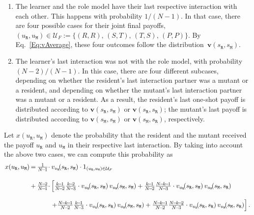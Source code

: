 \documentclass[11pt]{article}
\def\resident{\texttt{R}}
\def\mutant{\texttt{M}}
\def\strategy{s}
\theoremstyle{plainCl1}
\theoremstyle{plainCl2}
\begin{document}

\begin{enumerate}
\item The learner and the role model have their last respective interaction with each other. This happens with probability $1/(N\!-\!1)$. In that case, there are four possible cases for their joint final payoffs, $(u_\resident,u_\mutant)\in\mathcal{U}_F\!:=\!\big\{(R,R),\,(S,T),\,(T,S),\,(P,P)\big\}$. By Eq.~\eqref{Eq:vAverage}, these four outcomes follow the distribution~$\mathbf{v}(\strategy_\resident,\strategy_\mutant)$.
\item The learner's last interaction was not with the role model, with probability $(N\!-\!2)/(N\!-\!1)$. In this case, there are four different subcases, depending on whether the resident's last interaction partner was a mutant or a resident, and depending on whether the mutant's last interaction partner was a mutant or a resident. As a result, the resident's last one-shot payoff is distributed according to $\mathbf{v}(\strategy_\resident,\strategy_\mutant)$ or $\mathbf{v}(\strategy_\resident,\strategy_\resident)$; the mutant's last payoff is distributed according to $\mathbf{v}(\strategy_\mutant,\strategy_\mutant)$ or $\mathbf{v}(\strategy_\mutant,\strategy_\resident)$, respectively. 
\end{enumerate}

\noindent
Let $x(u_\resident,u_\mutant)$ denote the probability that the resident and the mutant received the payoff $u_\resident$ and $u_\mutant$ in their respective last interaction.  
By taking into account the above two cases, we can compute this probability as
\begin{equation}\label{eq:Chi} 
\setlength{\arraycolsep}{1pt} 
\begin{array}{llll}
x(u_\resident,u_\mutant)	 &=
&\frac{1}{N\!-\!1}\cdot  & v_{u_\resident}\!(\strategy_\resident,\strategy_\mutant)\cdot 1_{(u_\resident,u_\mutant)\in \mathcal{U}_F}\\[0.5cm]
&+	
&\frac{N\!-\!2}{N\!-\!1} \cdot 
&\left[ \frac{k\!-\!1}{N\!-\!2}\frac{k\!-\!2}{N\!-\!3}\cdot  v_{u_\resident}\!(\strategy_\resident,\strategy_\mutant) \, v_{u_\mutant}\!(\strategy_\mutant,\strategy_\mutant) + 
 \frac{k\!-\!1}{N\!-\!2}\frac{N\!-\!k\!-\!1}{N\!-\!3}\cdot  v_{u_\resident}\!(\strategy_\resident,\strategy_\mutant) \, v_{u_\mutant}\!(\strategy_\mutant,\strategy_\resident)\right.\\[0.5cm]
&&&\left. +\frac{N\!-\!k\!-\!1}{N\!-\!2}\frac{k\!-\!1}{N\!-\!3} \cdot v_{u_\resident}\!(\strategy_\resident,\strategy_\resident) \,  v_{u_\mutant}\!(\strategy_\mutant,\strategy_\mutant) + 
 \frac{N\!-\!k\!-\!1}{N\!-\!2}\frac{N\!-\!k\!-\!2}{N\!-\!3} \cdot v_{u_\resident}\!(\strategy_\resident,\strategy_\resident) \, v_{u_\mutant}\!(\strategy_\mutant,\strategy_\resident)\right].
\end{array}
\end{equation}
\end{document}
